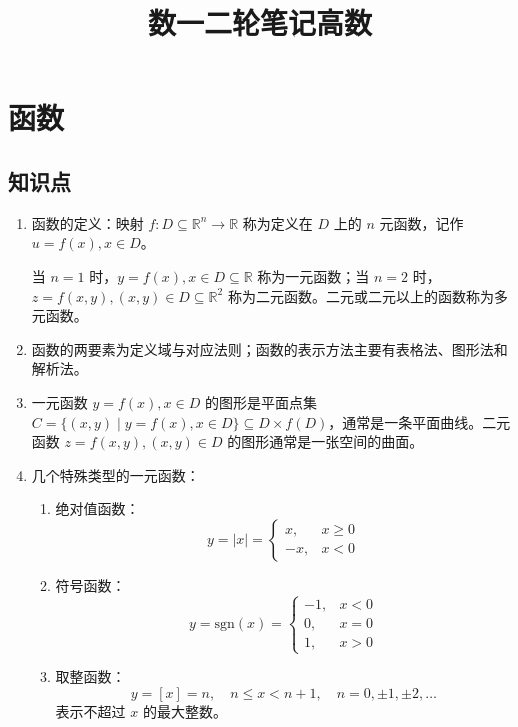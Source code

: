 \documentclass[UTF8]{ctexart}
\title{数一二轮笔记高数}
\author{}
\date{}
\theoremstyle{remark}
\begin{document}
	\maketitle
	\tableofcontents
	
	\section{函数}
	
	\subsection*{知识点}
	
	\begin{enumerate}
		\item 函数的定义：映射 $ f: D \subseteq \mathbb{R}^n \to \mathbb{R} $ 称为定义在 $ D $ 上的 $ n $ 元函数，记作 $ u = f(x), x \in D $。
		
		当 $ n = 1 $ 时，$ y = f(x), x \in D \subseteq \mathbb{R} $ 称为一元函数；当 $ n = 2 $ 时，$ z = f(x, y), (x, y) \in D \subseteq \mathbb{R}^2 $ 称为二元函数。二元或二元以上的函数称为多元函数。
		
		\item 函数的两要素为定义域与对应法则；函数的表示方法主要有表格法、图形法和解析法。
		
		\item 一元函数 $ y = f(x), x \in D $ 的图形是平面点集 $ C = \{(x, y) \mid y = f(x), x \in D\} \subseteq D \times f(D) $，通常是一条平面曲线。二元函数 $ z = f(x, y), (x, y) \in D $ 的图形通常是一张空间的曲面。
		
		\item 几个特殊类型的一元函数：
		\begin{enumerate}
			\item 绝对值函数：$$ y = |x| = 
			\begin{cases}
				x, & x \geq 0 \\
				-x, & x < 0
			\end{cases} $$
			
			\item 符号函数：$$ y = \text{sgn}(x) = 
			\begin{cases}
				-1, & x < 0 \\
				0, & x = 0 \\
				1, & x > 0
			\end{cases} $$
			
			\item 取整函数：$$ y = [x] = n, \quad n \leq x < n+1, \quad n = 0, \pm 1, \pm 2, \dots $$ 表示不超过 $ x $ 的最大整数。
			

\end{enumerate}
\end{enumerate}
\end{document}
